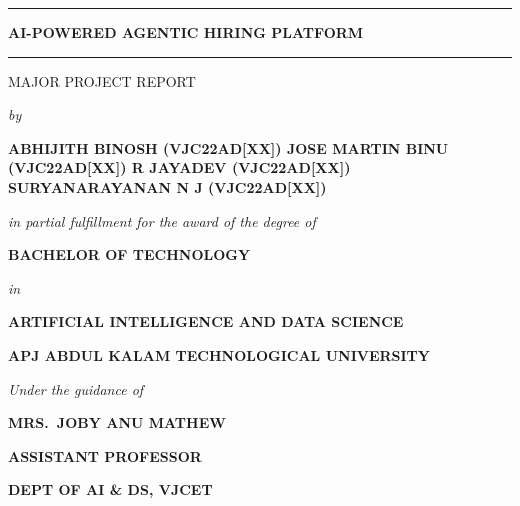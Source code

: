 \documentclass[12pt,a4paper]{report}
\newcommand{\HRule}{\rule{\linewidth}{0.5mm}}
\begin{document}
\begin{titlepage}
\begin{center}
    \HRule
    \par\vspace{0.3cm}
    {\Large\bfseries AI-POWERED AGENTIC HIRING PLATFORM}
    \par\vspace{0.2cm}
    \HRule
    \par\vspace{0.6cm}

    {\large MAJOR PROJECT REPORT}
    \par\vspace{0.2cm}
    {\normalsize\textit{by}}
    \par\vspace{0.4cm}

    {\large\bfseries
        ABHIJITH BINOSH (VJC22AD[XX]) \newline
        JOSE MARTIN BINU (VJC22AD[XX]) \newline
        R JAYADEV (VJC22AD[XX]) \newline
        SURYANARAYANAN N J (VJC22AD[XX])
    }
    \par\vspace{0.4cm}

    {\normalsize\textit{in partial fulfillment for the award of the degree of}}
    \par\vspace{0.2cm}

    {\large\bfseries BACHELOR OF TECHNOLOGY}
    \par\vspace{0.1cm}
    {\normalsize\textit{in}}
    \par\vspace{0.2cm}

    {\large\bfseries ARTIFICIAL INTELLIGENCE AND DATA SCIENCE}
    \par\vspace{0.1cm}
    {\large\bfseries APJ ABDUL KALAM TECHNOLOGICAL UNIVERSITY}
    \par\vspace{0.4cm}

    {\normalsize\textit{Under the guidance of}}
    \par\vspace{0.2cm}
    {\large\bfseries MRS.\ JOBY ANU MATHEW}
    \par\vspace{0.1cm}
    {\large\bfseries ASSISTANT PROFESSOR}
    \par\vspace{0.1cm}
    {\large\bfseries DEPT OF AI \& DS, VJCET}
    \par\vspace{0.5cm}


\end{center}
\end{titlepage}
\end{document}
